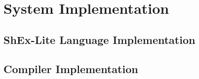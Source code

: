 \setchapterpreamble[u]{\margintoc}
\chapter{System Implementation}

\section{ShEx-Lite Language Implementation}

\section{Compiler Implementation}